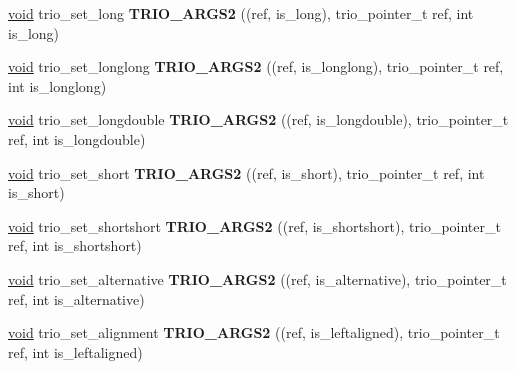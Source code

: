 \begin{DoxyCompactItemize}
\item 
\mbox{\label{group___user_defined_ga6485a2719151b2a045996e7884188ee2}} 
\hyperlink{interfacevoid}{void} trio\+\_\+set\+\_\+long {\bfseries T\+R\+I\+O\+\_\+\+A\+R\+G\+S2} ((ref, is\+\_\+long), trio\+\_\+pointer\+\_\+t ref, int is\+\_\+long)
\item 
\mbox{\label{group___user_defined_ga43a153f704e8c919f1a9b8bc1b0f7602}} 
\hyperlink{interfacevoid}{void} trio\+\_\+set\+\_\+longlong {\bfseries T\+R\+I\+O\+\_\+\+A\+R\+G\+S2} ((ref, is\+\_\+longlong), trio\+\_\+pointer\+\_\+t ref, int is\+\_\+longlong)
\item 
\mbox{\label{group___user_defined_gab2627e54f0d7580f22095e358c7a1362}} 
\hyperlink{interfacevoid}{void} trio\+\_\+set\+\_\+longdouble {\bfseries T\+R\+I\+O\+\_\+\+A\+R\+G\+S2} ((ref, is\+\_\+longdouble), trio\+\_\+pointer\+\_\+t ref, int is\+\_\+longdouble)
\item 
\mbox{\label{group___user_defined_ga81d9321e85467db122f8d7f007021858}} 
\hyperlink{interfacevoid}{void} trio\+\_\+set\+\_\+short {\bfseries T\+R\+I\+O\+\_\+\+A\+R\+G\+S2} ((ref, is\+\_\+short), trio\+\_\+pointer\+\_\+t ref, int is\+\_\+short)
\item 
\mbox{\label{group___user_defined_ga8ef963e8179126c07f84dd9ae0e32456}} 
\hyperlink{interfacevoid}{void} trio\+\_\+set\+\_\+shortshort {\bfseries T\+R\+I\+O\+\_\+\+A\+R\+G\+S2} ((ref, is\+\_\+shortshort), trio\+\_\+pointer\+\_\+t ref, int is\+\_\+shortshort)
\item 
\mbox{\label{group___user_defined_gacd06c0fd74c4059799acc47aaca36f4f}} 
\hyperlink{interfacevoid}{void} trio\+\_\+set\+\_\+alternative {\bfseries T\+R\+I\+O\+\_\+\+A\+R\+G\+S2} ((ref, is\+\_\+alternative), trio\+\_\+pointer\+\_\+t ref, int is\+\_\+alternative)
\item 
\mbox{\label{group___user_defined_ga35e2f2465d01f0e22dfd9872fc550864}} 
\hyperlink{interfacevoid}{void} trio\+\_\+set\+\_\+alignment {\bfseries T\+R\+I\+O\+\_\+\+A\+R\+G\+S2} ((ref, is\+\_\+leftaligned), trio\+\_\+pointer\+\_\+t ref, int is\+\_\+leftaligned)
\item 

\end{DoxyCompactItemize}
